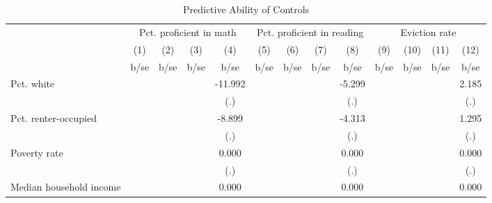 \begin{table}[htbp]\centering
\def\sym#1{\ifmmode^{#1}\else\(^{#1}\)\fi}
\caption{Predictive Ability of Controls}
\begin{tabular}{l*{12}{c}}
\toprule
                    &\multicolumn{4}{c}{Pct. proficient in math}        &\multicolumn{4}{c}{Pct. proficient in reading}     &\multicolumn{4}{c}{Eviction rate}                  \\\cmidrule(lr){2-5}\cmidrule(lr){6-9}\cmidrule(lr){10-13}
                    &\multicolumn{1}{c}{(1)}&\multicolumn{1}{c}{(2)}&\multicolumn{1}{c}{(3)}&\multicolumn{1}{c}{(4)}&\multicolumn{1}{c}{(5)}&\multicolumn{1}{c}{(6)}&\multicolumn{1}{c}{(7)}&\multicolumn{1}{c}{(8)}&\multicolumn{1}{c}{(9)}&\multicolumn{1}{c}{(10)}&\multicolumn{1}{c}{(11)}&\multicolumn{1}{c}{(12)}\\
                    &        b/se&        b/se&        b/se&        b/se&        b/se&        b/se&        b/se&        b/se&        b/se&        b/se&        b/se&        b/se\\
\midrule
\hspace{0.25cm} Pct. white&            &            &            &     -11.992&            &            &            &      -5.299&            &            &            &       2.185\\
                    &            &            &            &         (.)&            &            &            &         (.)&            &            &            &         (.)\\
\hspace{0.25cm} Pct. renter-occupied&            &            &            &      -8.899&            &            &            &      -4.313&            &            &            &       1.295\\
                    &            &            &            &         (.)&            &            &            &         (.)&            &            &            &         (.)\\
\hspace{0.25cm} Poverty rate&            &            &            &       0.000&            &            &            &       0.000&            &            &            &       0.000\\
                    &            &            &            &         (.)&            &            &            &         (.)&            &            &            &         (.)\\
\hspace{0.25cm} Median household income&            &            &            &       0.000&            &            &            &       0.000&            &            &            &       0.000\\

\end{tabular}
\end{table}
